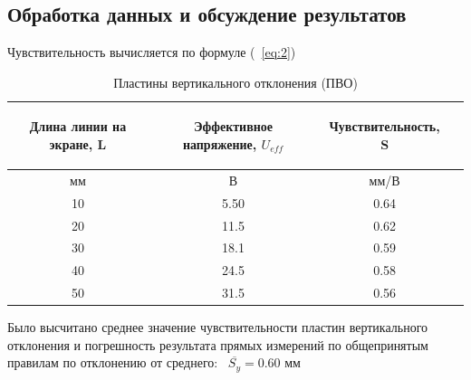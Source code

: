 \subsection{Обработка данных и обсуждение результатов}
Чувствительность вычисляется по формуле (~\ref{eq:2})
\begin{center}
\begin{table}[h!]
\centering
\caption{Пластины вертикального отклонения (ПВО)}
\label{tabl:1}
\begin{tabular}{|c|c|c|c|}
\hline
\begin{minipage}{5cm}
\begin{center}
       Длина линии на экране, L
\end{center}
\end{minipage} &
\begin{minipage}{5cm}
\begin{center}
    Эффективное напряжение, $U_{eff}$
    \end{center}
\end{minipage} &
\begin{minipage}{5cm}
\begin{center}
    Чувствительность, S
\end{center}
\end{minipage}\\
\hline
мм&В&мм/В\\
\hline
10  &  5.50  &  0.64 \\
20  &  11.5  &  0.62\\
30  &  18.1  &  0.59 \\
40  &  24.5  &  0.58 \\
50  &  31.5  &  0.56 \\

\hline
\end{tabular}
\end{table}
\end{center}
Было высчитано среднее значение чувствительности пластин вертикального отклонения и погрешность результата прямых измерений по общепринятым правилам по отклонению от среднего:
\ $\overline{S_y}=0.60$ мм
